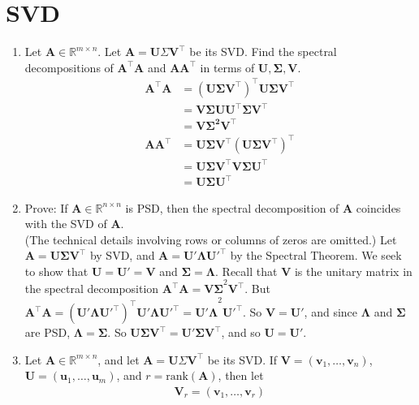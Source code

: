 \documentclass{article}
\begin{document}
\section{SVD}
\begin{enumerate}[label=(\alph*)]
\item Let $\textbf{A} \in \mathbb{R}^{m \times n}$. Let $\textbf{A} = \textbf{U}\Sigma\textbf{V}^\top$ be its SVD. Find the spectral decompositions of $\textbf{A}^\top\textbf{A}$ and $\textbf{A}\textbf{A}^\top$ in terms of $\mathbf{U, \Sigma, V}$. \\
{\color{blue} \begin{align*}
\mathbf{A^{\top}A} &= \mathbf{(U\Sigma V^{\top})^{\top}U\Sigma V^{\top}} \\
&= \mathbf{V\Sigma UU^{\top}\Sigma V^{\top} } \\
&= \mathbf{V\Sigma^2V^{\top}}
\end{align*} \begin{align*}
\mathbf{AA^{\top}} &= \mathbf{U\Sigma V^{\top}(U\Sigma V^{\top})^{\top}} \\
&= \mathbf{U\Sigma V^{\top}V\Sigma U^{\top}} \\
&= \mathbf{U\Sigma U^{\top}}
\end{align*}}
\item Prove: If $\textbf{A} \in \mathbb{R}^{n \times n}$ is PSD, then the spectral decomposition of $\textbf{A}$ coincides with the SVD of $\textbf{A}$. \\
{\color{blue} (The technical details involving rows or columns of zeros are omitted.) Let $\mathbf{A = U\Sigma V^{\top}}$ by SVD, and $\mathbf{A = U'\Lambda U'^{\top}}$ by the Spectral Theorem. We seek to show that $\mathbf{U = U' = V}$ and $\mathbf{\Sigma = \Lambda}$. Recall that $\mathbf{V}$ is the unitary matrix in the spectral decomposition $\mathbf{A^{\top}A = V\Sigma}^2\mathbf{V^{\top}}$. But $\mathbf{A^{\top}A} = \mathbf{(U'\Lambda U'^{\top})^{\top}U'\Lambda U'^{\top} = U'\Lambda}^2\mathbf{U'^{\top}}$. So $\mathbf{V = U'}$, and since $\mathbf{\Lambda}$ and $\mathbf{\Sigma}$ are PSD, $\mathbf{\Lambda = \Sigma}$. So $\mathbf{U\Sigma V^{\top} = U'\Sigma V^{\top}}$, and so $\mathbf{U} = \mathbf{U'}$.}
\item Let $\textbf{A} \in \mathbb{R}^{m \times n}$, and let $\textbf{A} = \textbf{U}\Sigma\textbf{V}^\top$ be its SVD. If $\textbf{V} = (\textbf{v}_1, \hdots, \textbf{v}_n)$, $\textbf{U} = (\textbf{u}_1, \hdots, \textbf{u}_m)$, and $r = \text{rank}(\textbf{A})$, then let
\begin{gather*}
\textbf{V}_r = (\textbf{v}_1, \hdots, \textbf{v}_r) \\

\end{gather*}
\end{enumerate}
\end{document}
